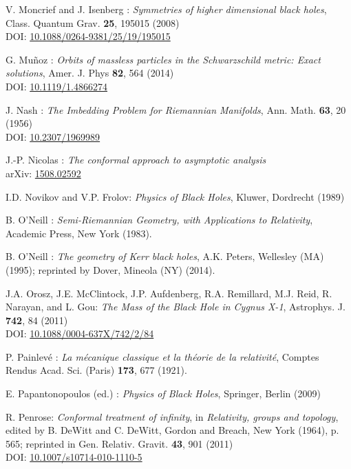 \begin{thebibliography}{123}
V. Moncrief and J. Isenberg :
{\em Symmetries of higher dimensional black holes},
Class. Quantum Grav. {\bf 25}, 195015 (2008)\\
DOI: \href{https://doi.org/10.1088/0264-9381/25/19/195015}{10.1088/0264-9381/25/19/195015}

G. Mu\~noz :
{\em Orbits of massless particles in the Schwarzschild metric: Exact solutions},
Amer. J. Phys {\bf 82}, 564 (2014)\\
DOI: \href{https://doi.org/10.1119/1.4866274}{10.1119/1.4866274}

J. Nash  :
{\em The Imbedding Problem for Riemannian Manifolds},
Ann. Math. {\bf 63}, 20 (1956)\\
DOI: \href{https://doi.org/10.2307/1969989}{10.2307/1969989}

J.-P. Nicolas :
{\em The conformal approach to asymptotic analysis} \\
arXiv: \href{https://arxiv.org/abs/1508.02592}{1508.02592}

I.D. Novikov and V.P. Frolov: {\em Physics of Black Holes},
Kluwer, Dordrecht (1989)

B. O'Neill : {\em Semi-Riemannian Geometry, with Applications to Relativity},
Academic Press, New York (1983).

B. O'Neill : {\em The geometry of Kerr black holes}, A.K. Peters, Wellesley (MA) (1995);
reprinted by Dover, Mineola (NY) (2014).

J.A. Orosz, J.E. McClintock, J.P. Aufdenberg, R.A. Remillard, M.J. Reid, R. Narayan, and L. Gou:
{\em The Mass of the Black Hole in Cygnus X-1},
Astrophys. J. {\bf 742}, 84 (2011)\\
DOI: \href{https://doi.org/10.1088/0004-637X/742/2/84}{10.1088/0004-637X/742/2/84}

P. Painlevé : \emph{La mécanique classique et la théorie de la relativité},
Comptes Rendus Acad. Sci. (Paris) {\bf 173}, 677 (1921).

E. Papantonopoulos (ed.) : {\em Physics of Black Holes}, Springer, Berlin (2009)

R. Penrose: {\em Conformal treatment of infinity}, in {\em Relativity, groups and topology},
edited by B. DeWitt and C. DeWitt,
Gordon and Breach, New York (1964), p. 565; reprinted in
Gen. Relativ. Gravit. {\bf 43}, 901 (2011)\\
DOI: \href{https://doi.org/10.1007/s10714-010-1110-5}{10.1007/s10714-010-1110-5}


\end{thebibliography}
